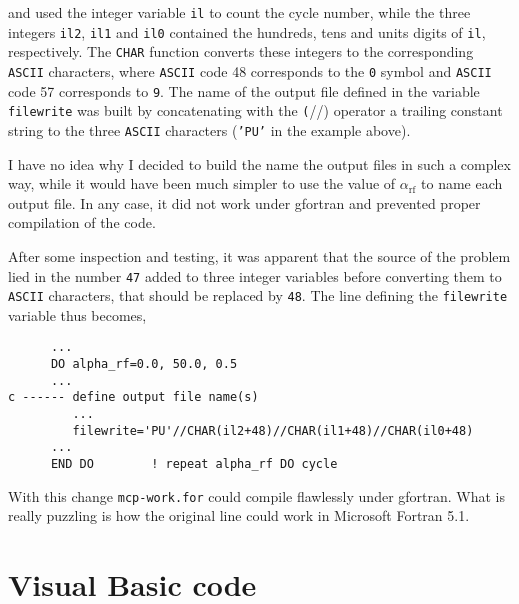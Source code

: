 and used the integer variable \texttt{il} to count the cycle number, while the three integers \texttt{il2}, \texttt{il1} and \texttt{il0} contained the hundreds, tens and units digits of \texttt{il}, respectively. 
The \texttt{CHAR} function converts these integers to the corresponding \texttt{ASCII} characters, where \texttt{ASCII} code 48 corresponds to the \texttt{0} symbol and \texttt{ASCII} code 57 corresponds to \texttt{9}.
The name of the output file defined in the variable \texttt{filewrite} was built by concatenating with the \texttt(//) operator a trailing constant string to the three \texttt{ASCII} characters (\texttt{'PU'} in the example above).

I have no idea why I decided to build the name the output files in such a complex way, while it would have been much simpler to use the value of $\alpha_\mathrm{rf}$ to name each output file.
In any case, it did not work under gfortran and prevented proper compilation of the code. 

After some inspection and testing, it was apparent that the source of the problem lied in the number \texttt{47} added to three integer variables before converting them to \texttt{ASCII} characters, that should be replaced by \texttt{48}. 
The line defining the \texttt{filewrite} variable thus becomes, %

\begin{lstlisting}
      ...
      DO alpha_rf=0.0, 50.0, 0.5
      ...
c ------ define output file name(s)
         ...
         filewrite='PU'//CHAR(il2+48)//CHAR(il1+48)//CHAR(il0+48)
      ...
      END DO        ! repeat alpha_rf DO cycle
\end{lstlisting}

With this change \texttt{mcp-work.for} could compile flawlessly under gfortran.
What is really puzzling is how the original line could work in Microsoft Fortran 5.1.



\section{Visual Basic code}
\label{visual-basic-code}

